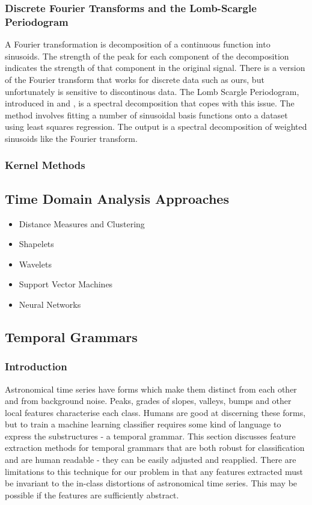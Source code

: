 \documentclass[11pt]{article}
\begin{document}
	\subsubsection{Discrete Fourier Transforms and the Lomb-Scargle Periodogram}
	A Fourier transformation is decomposition of a continuous function into sinusoids. The strength of the peak for each component of the decomposition indicates the strength of that component in the original signal. There is a version of the Fourier transform that works for discrete data such as ours, but unfortunately is sensitive to discontinous data. The Lomb Scargle Periodogram, introduced in \citep{lomb1976least} and \citep{scargle1982studies}, is a spectral decomposition that copes with this issue. The method involves fitting a number of sinusoidal basis functions onto a dataset using least squares regression. The output is a spectral decomposition of weighted sinusoids like the Fourier transform.
	
	\subsubsection{Kernel Methods}
	\citep{wachman2009kernels}
	
	\subsection{Time Domain Analysis Approaches}
	\begin{itemize}
		\item Distance Measures and Clustering
		\item Shapelets
		\item Wavelets
		\item Support Vector Machines
		\item Neural Networks
	\end{itemize}
	\subsection{Temporal Grammars}
	\subsubsection{Introduction}
	Astronomical time series have forms which make them distinct from each other and from background noise. Peaks, grades of slopes, valleys, bumps and other local features characterise each class. Humans are good at discerning these forms, but to train a machine learning classifier requires some kind of language to express the substructures - a temporal grammar. This section discusses feature extraction methods for temporal grammars that are both robust for classification and are human readable - they can be easily adjusted and reapplied. There are limitations to this technique for our problem in that any features extracted must be invariant to the in-class distortions of astronomical time series. This may be possible if the features are sufficiently abstract.
\end{document}
